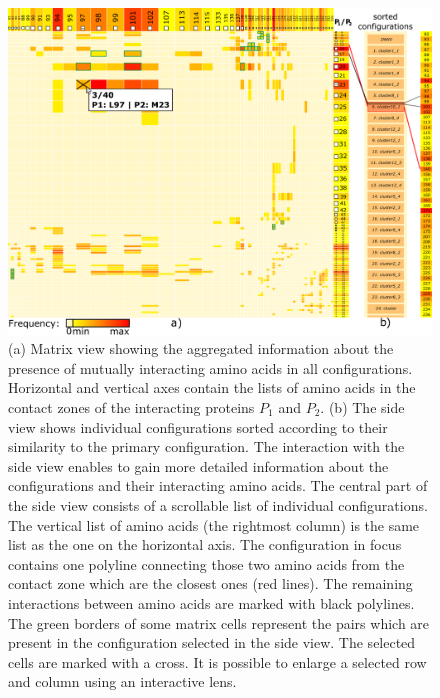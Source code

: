 \documentclass{bmcart}
\def\MatView {Matrix view\xspace}
\begin{document}
\begin{backmatter}
\begin{figure}[h!]
  \centering
  \includegraphics[width=0.9\columnwidth]{images/figure4.pdf}
  \caption{
  (a) \MatView showing the aggregated information about the presence of mutually interacting amino acids in all configurations. Horizontal and vertical axes contain the lists of amino acids in the contact zones of the interacting proteins $P_1$ and $P_2$. (b) The side view shows individual configurations sorted according to their similarity to the primary configuration. The interaction with the side view enables to gain more detailed information about the configurations and their interacting amino acids. The central part of the side view consists of a scrollable list of individual configurations. The vertical list of amino acids (the rightmost column) is the same list as the one on the horizontal axis. The configuration in focus contains one polyline connecting those two amino acids from the contact zone which are the closest ones (red lines). The remaining interactions between amino acids are marked with black polylines. The green borders of some matrix cells represent the pairs which are present in the configuration selected in the side view. The selected cells are marked with a cross. It is possible to enlarge a selected row and column using an interactive lens.}
  \label{fig:matrixlens}
\end{figure}





\end{backmatter}
\end{document}
